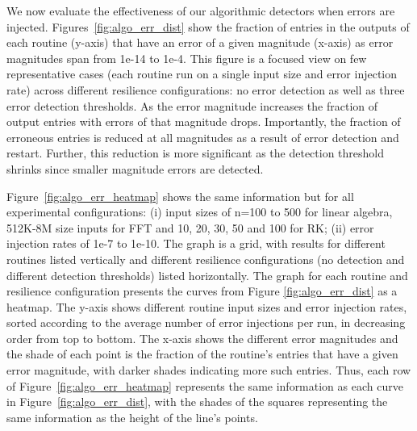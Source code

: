 \documentclass{sig-alternate}
\begin{document}
We now evaluate the effectiveness of our algorithmic detectors when errors are injected.
Figures~\ref{fig:algo_err_dist} show the fraction of entries in the outputs of each routine (y-axis) that have an error of a given magnitude (x-axis) as error magnitudes span from 1e-14 to 1e-4.
This figure is a focused view on few representative cases (each routine run on a single input size and error injection rate) across different resilience configurations: no error detection as well as three error detection thresholds.
As the error magnitude increases the fraction of output entries with errors of that magnitude drops.
Importantly, the fraction of erroneous entries is reduced at all magnitudes as a result of error detection and restart.
Further, this reduction is more significant as the detection threshold shrinks since smaller magnitude errors are detected.

Figure~\ref{fig:algo_err_heatmap} shows the same information but for all experimental configurations: (i) input sizes of n=100 to 500 for linear algebra, 512K-8M size inputs for FFT and 10, 20, 30, 50 and 100 for RK; (ii) error injection rates of 1e-7 to 1e-10.
The graph is a grid, with results for different routines listed vertically and different resilience configurations (no detection and different detection thresholds) listed horizontally.
The graph for each routine and resilience configuration presents the curves from Figure \ref{fig:algo_err_dist} as a heatmap.
The y-axis shows different routine input sizes and error injection rates, sorted according to the average number of error injections per run, in decreasing order from top to bottom.
The x-axis shows the different error magnitudes and the shade of each point is the fraction of the routine's entries that have a given error magnitude, with darker shades indicating more such entries.
Thus, each row of Figure~\ref{fig:algo_err_heatmap} represents the same information as each curve in Figure~\ref{fig:algo_err_dist}, with the shades of the squares representing the same information as the height of the line's points.
\end{document}
